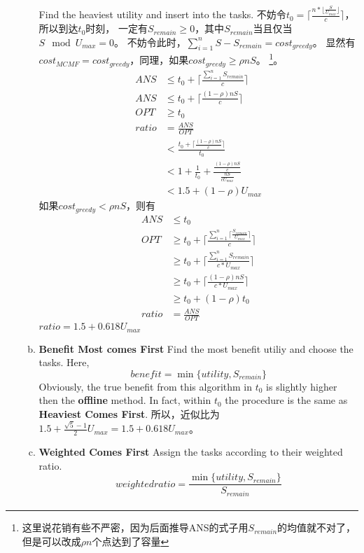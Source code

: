 \documentclass[UTF8]{ctexart}
\newcommand{\Emph}{\textbf}
\begin{document}
\begin{enumerate}[I]
\begin{enumerate}[(a)]
		Find the heaviest utility and insert into the tasks.
		不妨令$t_0 = \lceil \frac{n * \lfloor \frac{S}{U_{max}} \rfloor}{c} \rceil$，所以到达$t_{0}$时刻，
		一定有$S_{remain} \ge 0$，其中$S_{remain}$当且仅当$S \mod U_{max} = 0$。
		不妨令此时，$\sum\limits_{i=1}^{n}{S-S_{remain}} = cost_{greedy}$。
		显然有$cost_{MCMF} = cost_{greedy}$，同理，如果$cost_{greedy} \ge \rho nS$。
		\footnote{这里说花销有些不严密，因为后面推导ANS的式子用$S_{remain}$的均值就不对了，但是可以改成$\rho n$个点达到了容量}。
		\begin{align*}
			ANS &\le t_{0} + \lceil \frac{ \sum\limits_{i=1}^n S_{remain} }{c} \rceil \\
			ANS &\le t_{0} + \lceil \frac{(1-\rho)nS}{c} \rceil \\
			OPT &\ge t_{0} \\
			ratio &= \frac{ANS}{OPT} \\
				  &< \frac{t_{0} + \lceil \frac{(1-\rho)nS}{c} \rceil}{t_{0}} \\
				  &< 1 + \frac{1}{t_{0}} + \frac{ \frac{(1-\rho)nS}{c} }{ \frac{nS}{cU_{max}} } \\
				  &< 1.5 + (1-\rho)U_{max}
		\end{align*}
		如果$cost_{greedy} < \rho nS$，则有
		\begin{align*}
			ANS &\le t_{0} \\
			OPT &\ge t_{0} + \lceil \frac{ \sum\limits_{i=1}^n \lceil \frac{S_{remain}}{U_{max}} \rceil }{c} \rceil \\
				&\ge t_{0} + \lceil \frac{ \sum\limits_{i=1}^n {S_{remain}} }{c*U_{max}} \rceil \\
				&\ge t_{0} + \lceil \frac{(1-\rho)nS } {c*U_{max}} \rceil \\
				&\ge t_{0} + (1-\rho)t_{0} \\
			ratio &= \frac{ANS}{OPT}			
		\end{align*}
		$ratio = 1.5 + 0.618 U_{max}$
		
		\item \Emph{Benefit Most comes First}
		Find the most benefit utiliy and choose the tasks. Here,
		\[
			benefit = \min \{ utility, S_{remain} \}
		\]
		Obviously, the true benefit from this algorithm in $t_0$ is slightly higher then the \Emph{offline} method.
		In fact, within $t_0$ the procedure is the same as \Emph{Heaviest Comes First}.
		所以，近似比为$1.5 + \frac{\sqrt5-1}{2} U_{max} = 1.5 + 0.618U_{max}$。
		
		\item \Emph{Weighted Comes First}
		Assign the tasks according to their weighted ratio.
		\[
			weighted ratio = \frac{\min \{ utility, S_{remain} \}}{S_{remain}}
		\]
		\begin{align*}
		\end{align*}
		

\end{enumerate}
\end{enumerate}
\end{document}
